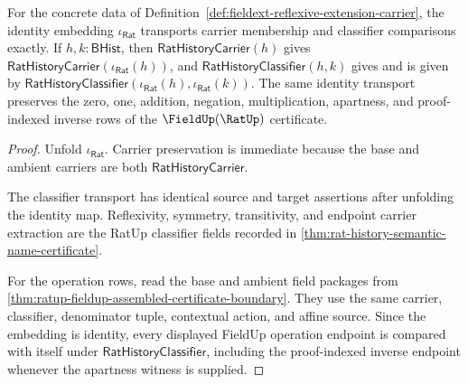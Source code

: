 \begin{theorem}
\label{thm:fieldext-reflexive-embedding-transport}
For the concrete data of
Definition~\ref{def:fieldext-reflexive-extension-carrier}, the identity
embedding $\iota_{\mathsf{Rat}}$ transports carrier membership and classifier
comparisons exactly. If $h,k:\mathsf{BHist}$, then
$\mathsf{RatHistoryCarrier}(h)$ gives
$\mathsf{RatHistoryCarrier}(\iota_{\mathsf{Rat}}(h))$, and
$\mathsf{RatHistoryClassifier}(h,k)$ gives and is given by
$\mathsf{RatHistoryClassifier}(\iota_{\mathsf{Rat}}(h),\iota_{\mathsf{Rat}}(k))$. The same
identity transport preserves the zero, one, addition, negation,
multiplication, apartness, and proof-indexed inverse rows of the
$\FieldUp(\RatUp)$ certificate.
\end{theorem}
\begin{proof}
Unfold $\iota_{\mathsf{Rat}}$. Carrier preservation is immediate because the base and
ambient carriers are both $\mathsf{RatHistoryCarrier}$.

The classifier transport has identical source and target assertions after
unfolding the identity map. Reflexivity, symmetry, transitivity, and endpoint
carrier extraction are the RatUp classifier fields recorded in
\autoref{thm:rat-history-semantic-name-certificate}.

For the operation rows, read the base and ambient field packages from
\autoref{thm:ratup-fieldup-assembled-certificate-boundary}. They use the same
carrier, classifier, denominator tuple, contextual action, and affine source.
Since the embedding is identity, every displayed FieldUp operation endpoint is
compared with itself under $\mathsf{RatHistoryClassifier}$, including the
proof-indexed inverse endpoint whenever the apartness witness is supplied.
\end{proof}

